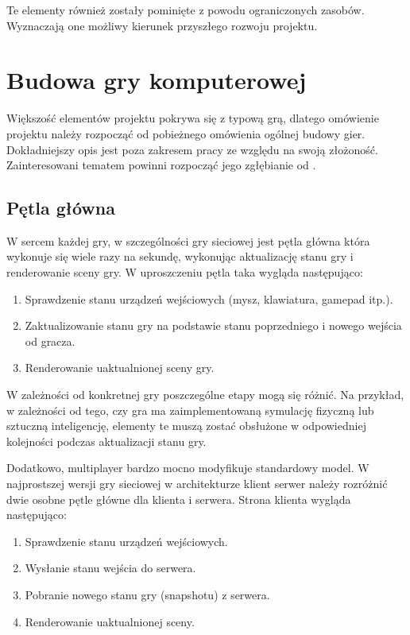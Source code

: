 Te elementy również zostały pominięte z powodu ograniczonych zasobów. Wyznaczają one
możliwy kierunek przyszłego rozwoju projektu.


\section{Budowa gry komputerowej}
\label{sec:budowaGry}

Większość elementów projektu pokrywa się z typową grą, dlatego omówienie projektu należy
rozpocząć od pobieżnego omówienia ogólnej budowy gier. Dokładniejszy opis jest poza zakresem
pracy ze względu na swoją złożoność. Zainteresowani tematem powinni rozpocząć jego
zgłębianie od \cite{game-engine}.

\subsection{Pętla główna}
\label{ssec:petlaGlowna}

W sercem każdej gry, w szczególności gry sieciowej jest pętla główna która wykonuje się wiele
razy na sekundę, wykonując aktualizację stanu gry i renderowanie sceny gry. W uproszczeniu pętla
taka wygląda następująco:

\begin{enumerate}
\item Sprawdzenie stanu urządzeń wejściowych (mysz, klawiatura, gamepad itp.).
\item Zaktualizowanie stanu gry na podstawie stanu poprzedniego i nowego wejścia od gracza.
\item Renderowanie uaktualnionej sceny gry.
\end{enumerate}

W zależności od konkretnej gry poszczególne etapy mogą się różnić. Na przykład, w zależności od
tego, czy gra ma zaimplementowaną symulację fizyczną lub sztuczną inteligencję, elementy te
muszą zostać obsłużone w odpowiedniej kolejności podczas aktualizacji stanu gry.

Dodatkowo, multiplayer bardzo mocno modyfikuje standardowy model. W najprostszej wersji
gry sieciowej w architekturze klient serwer należy rozróżnić dwie osobne pętle główne
dla klienta i serwera. Strona klienta wygląda następująco:

\begin{enumerate}
\item Sprawdzenie stanu urządzeń wejściowych.
\item Wysłanie stanu wejścia do serwera.
\item Pobranie nowego stanu gry (snapshotu) z serwera.
\item Renderowanie uaktualnionej sceny.
\end{enumerate}

